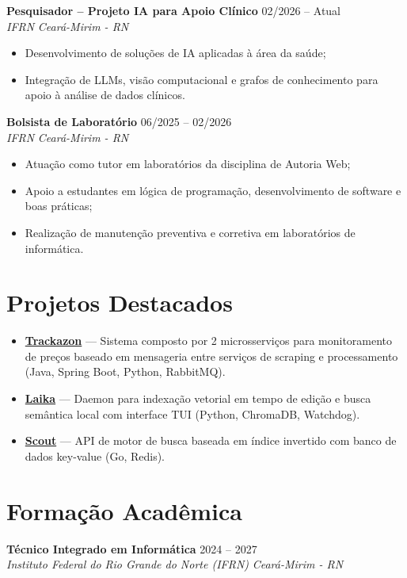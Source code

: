 \documentclass[a4paper,10pt]{article}
\newcommand{\entry}[4]{
  \noindent\textbf{#1} \hfill #2 \\
  \noindent\textit{#3} \hfill \textit{#4} \\
  \vspace{1pt}
}
\begin{document}
\vspace{1pt}

\entry{Pesquisador -- Projeto IA para Apoio Clínico}{02/2026 -- Atual}{IFRN}{Ceará-Mirim - RN}
\begin{itemize}
\item Desenvolvimento de soluções de IA aplicadas à área da saúde;
\item Integração de LLMs, visão computacional e grafos de conhecimento para apoio à análise de dados clínicos.
\end{itemize}

\vspace{1pt}

\entry{Bolsista de Laboratório}{06/2025 -- 02/2026}{IFRN}{Ceará-Mirim - RN}
\begin{itemize}
\item Atuação como tutor em laboratórios da disciplina de Autoria Web;
\item Apoio a estudantes em lógica de programação, desenvolvimento de software e boas práticas;
\item Realização de manutenção preventiva e corretiva em laboratórios de informática.
\end{itemize}

\section*{Projetos Destacados}

\begin{itemize}
\item \href{https://github.com/yuriteixeirac/trackazon}{\textbf{Trackazon}} --- Sistema composto por 2 microsserviços para monitoramento de preços baseado em mensageria entre serviços de scraping e processamento (Java, Spring Boot, Python, RabbitMQ).
\item \href{https://github.com/yuriteixeirac/laika}{\textbf{Laika}} --- Daemon para indexação vetorial em tempo de edição e busca semântica local com interface TUI (Python, ChromaDB, Watchdog).
\item \href{https://github.com/yuriteixeirac/scout}{\textbf{Scout}} --- API de motor de busca baseada em índice invertido com banco de dados key-value (Go, Redis).
\end{itemize}

\section*{Formação Acadêmica}

\entry{Técnico Integrado em Informática}{2024 -- 2027}{Instituto Federal do Rio Grande do Norte (IFRN)}{Ceará-Mirim - RN}
\end{document}
